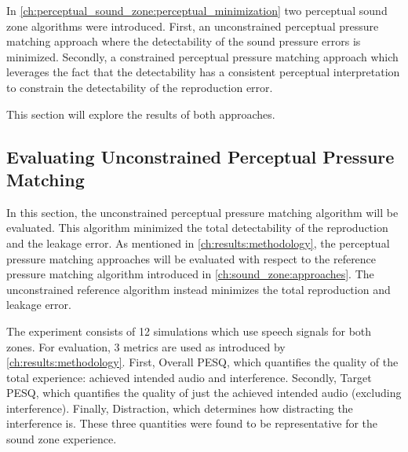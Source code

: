 In \autoref{ch:perceptual_sound_zone:perceptual_minimization} two perceptual sound zone algorithms were introduced. 
First, an unconstrained perceptual pressure matching approach where the detectability of the sound pressure errors is minimized.
Secondly, a constrained perceptual pressure matching approach which leverages the fact that the detectability has a consistent 
perceptual interpretation to constrain the detectability of the reproduction error.

This section will explore the results of both approaches.

\subsection{Evaluating Unconstrained Perceptual Pressure Matching}
In this section, the unconstrained perceptual pressure matching algorithm will be evaluated.
This algorithm minimized the total detectability of the reproduction and the leakage error.
As mentioned in \autoref{ch:results:methodology}, the perceptual pressure matching approaches will be evaluated with respect to the 
reference pressure matching algorithm introduced in \autoref{ch:sound_zone:approaches}.
The unconstrained reference algorithm instead minimizes the total reproduction and leakage error.

The experiment consists of 12 simulations which use speech signals for both zones.
For evaluation, 3 metrics are used as introduced by \autoref{ch:results:methodology}.
First, Overall PESQ, which quantifies the quality of the total experience: achieved intended audio and interference.
Secondly, Target PESQ, which quantifies the quality of just the achieved intended audio (excluding interference).
Finally, Distraction, which determines how distracting the interference is.
These three quantities were found to be representative for the sound zone experience.

